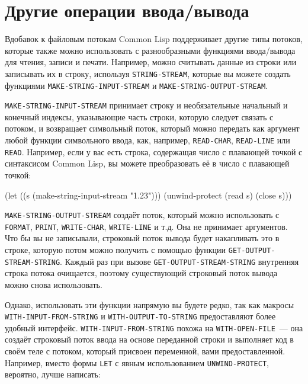 \section{Другие операции ввода/вывода}

Вдобавок к файловым потокам Common Lisp поддерживает другие типы потоков, которые также
можно использовать с разнообразными функциями ввода/вывода для чтения, записи и
печати. Например, можно считывать данные из строки или записывать их в строку, используя
\lstinline{STRING-STREAM}, которые вы можете создать функциями \lstinline{MAKE-STRING-INPUT-STREAM}
и \lstinline{MAKE-STRING-OUTPUT-STREAM}.

\lstinline{MAKE-STRING-INPUT-STREAM} принимает строку и необязательные начальный и конечный
индексы, указывающие часть строки, которую следует связать с потоком, и возвращает
символьный поток, который можно передать как аргумент любой функции символьного ввода,
как, например, \lstinline{READ-CHAR}, \lstinline{READ-LINE} или \lstinline{READ}. Например, если у вас
есть строка, содержащая число с плавающей точкой с синтаксисом Common Lisp, вы можете
преобразовать её в число с плавающей точкой:

\begin{myverb}
(let ((s (make-string-input-stream "1.23"))) 
  (unwind-protect (read s) 
    (close s))) 
\end{myverb}

\lstinline{MAKE-STRING-OUTPUT-STREAM} создаёт поток, который можно использовать с
\lstinline{FORMAT}, \lstinline{PRINT}, \lstinline{WRITE-CHAR}, \lstinline{WRITE-LINE} и т.д. Она не принимает
аргументов. Что бы вы не записывали, строковый поток вывода будет накапливать это в
строке, которую потом можно получить с помощью функции
\lstinline{GET-OUTPUT-STREAM-STRING}. Каждый раз при вызове \lstinline{GET-OUTPUT-STREAM-STRING}
внутренняя строка потока очищается, поэтому существующий строковый поток вывода можно
снова использовать.

Однако, использовать эти функции напрямую вы будете редко, так как макросы
\lstinline{WITH-INPUT-FROM-STRING} и \lstinline{WITH-OUTPUT-TO-STRING} предоставляют более удобный
интерфейс. \lstinline{WITH-INPUT-FROM-STRING} похожа на \lstinline{WITH-OPEN-FILE}~--- она создаёт
строковый поток ввода на основе переданной строки и выполняет код в своём теле с потоком,
который присвоен переменной, вами предоставленной. Например, вместо формы \lstinline{LET} с
явным использованием \lstinline{UNWIND-PROTECT}, вероятно, лучше написать:

